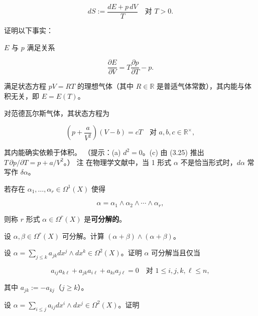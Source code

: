 \begin{exercises}
\[
dS := \frac{dE + p\,dV}{T} \quad \text{对 } T > 0 .
\]

证明以下事实：

\begin{items}
\item

$ E $ 与 $ p $ 满足关系

\[
\frac{\partial E}{\partial V} = T\frac{\partial p}{\partial T} - p .
\]
\item

满足状态方程 $ pV = RT $ 的理想气体（其中 $ R \in \mathbb{R} $ 是普适气体常数），其内能与体积无关，即 $ E = E(T) $。

\item

对范德瓦尔斯气体，其状态方程为

\begin{equation}
\left( p + \frac{a}{V^2} \right)(V - b) = cT \quad \text{对 } a, b, c \in \mathbb{R}^\times ,\tag{3.25}
\end{equation}

其内能确实依赖于体积。
（提示：(a) $ d^2 = 0 $。(c) 由 (3.25) 推出 $ T\,\partial p/\partial T = p + a/V^2 $。）
注 在物理学文献中，当 1 形式 $ \alpha $ 不是恰当形式时，$ d\alpha $ 常写作 $ \delta\alpha $。

\end{items}

\item

若存在 $ \alpha_1, \ldots, \alpha_r \in \Omega^1(X) $ 使得

\[
\alpha = \alpha_1 \wedge \alpha_2 \wedge \cdots \wedge \alpha_r ,
\]

则称 $ r $ 形式 $ \alpha \in \Omega^r(X) $ 是\textbf{可分解的}。

设 $ \alpha, \beta \in \Omega^r(X) $ 可分解。计算 $ (\alpha + \beta) \wedge (\alpha + \beta) $。

\item

设 $ \alpha = \sum_{j \le k} a_{jk} dx^j \wedge dx^k \in \Omega^2(X) $。证明 $ \alpha $ 可分解当且仅当

\[
a_{ij} a_{k\ell} + a_{jk} a_{i\ell} + a_{ki} a_{j\ell} = 0 \quad \text{对 } 1 \le i, j, k, \ell \le n ,
\]

其中 $ a_{jk} := -a_{kj} $（$ j \ge k $）。

\item

设 $ \alpha = \sum_{i \le j} a_{ij} dx^i \wedge dx^j \in \Omega^2(X) $。证明


\end{exercises}
